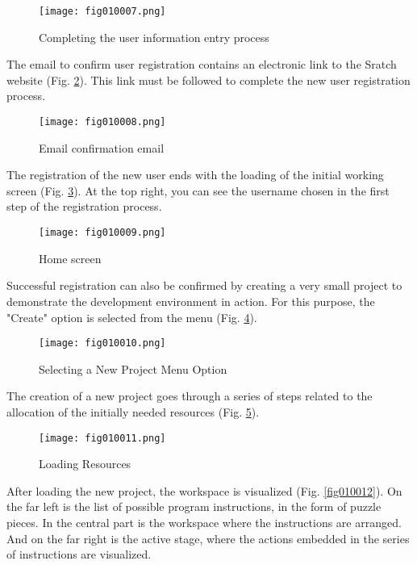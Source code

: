 \begin{figure}[H]
   \centering
   \texttt{[image: fig010007.png]}
   \caption{Completing the user information entry process}
\label{fig010007}
\end{figure}

The email to confirm user registration contains an electronic link to the Sratch website (Fig. \ref{fig010008}). This link must be followed to complete the new user registration process.

\begin{figure}[H]
   \centering
   \texttt{[image: fig010008.png]}
   \caption{Email confirmation email}
\label{fig010008}
\end{figure}

The registration of the new user ends with the loading of the initial working screen (Fig. \ref{fig010009}). At the top right, you can see the username chosen in the first step of the registration process.

\begin{figure}[H]
   \centering
   \texttt{[image: fig010009.png]}
   \caption{Home screen}
\label{fig010009}
\end{figure}

Successful registration can also be confirmed by creating a very small project to demonstrate the development environment in action. For this purpose, the "Create" option is selected from the menu (Fig. \ref{fig010010}).

\begin{figure}[H]
   \centering
   \texttt{[image: fig010010.png]}
   \caption{Selecting a New Project Menu Option}
\label{fig010010}
\end{figure}

The creation of a new project goes through a series of steps related to the allocation of the initially needed resources (Fig. \ref{fig010011}).

\begin{figure}[H]
   \centering
   \texttt{[image: fig010011.png]}
   \caption{Loading Resources}
\label{fig010011}
\end{figure}

After loading the new project, the workspace is visualized (Fig. \ref{fig010012}). On the far left is the list of possible program instructions, in the form of puzzle pieces. In the central part is the workspace where the instructions are arranged. And on the far right is the active stage, where the actions embedded in the series of instructions are visualized.

